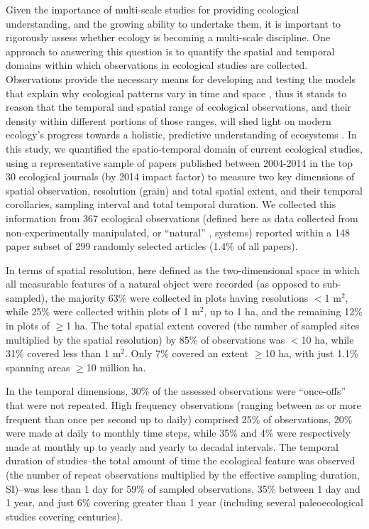 \documentclass[12pt]{article}
\begin{document}
Given the importance of multi-scale studies for providing ecological understanding, and the growing ability to undertake them, it is important to rigorously assess whether ecology is becoming a multi-scale discipline. One approach to answering this question is to quantify the spatial and temporal domains within which observations in ecological studies are collected. Observations provide the necessary means for developing and testing the models that explain why ecological patterns vary in time and space \cite{levin_problem_1992,tilman_ecological_1989}, thus it stands to reason that the temporal and spatial range of ecological observations, and their density within different portions of those ranges, will shed light on modern ecology's progress towards a holistic, predictive understanding of ecosystems \cite{chave_problem_2013,levin_problem_1992}. In this study, we quantified the spatio-temporal domain of current ecological studies, using a representative sample of papers published between 2004-2014 in the top 30 ecological journals (by 2014 impact factor) to measure two key dimensions of spatial observation, resolution (grain) and total spatial extent, and their temporal corollaries, sampling interval and total temporal duration. We collected this information from 367 ecological observations (defined here as data collected from non-experimentally manipulated, or ``natural'' \cite{tilman_ecological_1989}, systems) reported within a 148 paper subset of 299 randomly selected articles (1.4\% of all papers). 

In terms of spatial resolution, here defined as the two-dimensional space in which all measurable features of a natural object were recorded (as opposed to sub-sampled), the majority 63\% were collected in plots having resolutions $<$1 m$^2$, while 25\% were collected within plots of 1 m$^2$, up to 1 ha, and the remaining 12\% in plots of $\geq$1 ha. The total spatial extent covered (the number of sampled sites multiplied by the spatial resolution) by 85\% of observations was $<$10 ha, while 31\% covered less than 1 m$^2$.  Only 7\% covered an extent $\geq$10 ha, with just 1.1\% spanning areas $\geq$10 million ha. 

In the temporal dimensions, 30\% of the assessed observations were ``once-offs'' that were not repeated. High frequency observations (ranging between as or more frequent than once per second up to daily) comprised 25\% of observations, 20\% were made at daily to monthly time steps, while 35\% and 4\% were respectively made at monthly up to yearly and yearly to decadal intervals.  The temporal duration of studies--the total amount of time the ecological feature was observed (the number of repeat observations multiplied by the effective sampling duration, SI)--was less than 1 day for 59\% of sampled observations,  35\% between 1 day and 1 year, and just 6\% covering greater than 1 year (including several paleoecological studies covering centuries). 
\end{document}
